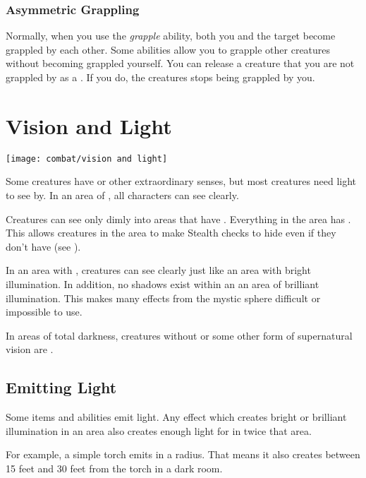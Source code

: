         \subsubsection{Asymmetric Grappling}\label{Asymmetric Grappling}
            Normally, when you use the \textit{grapple} ability, both you and the target become grappled by each other.
            Some abilities allow you to grapple other creatures without becoming grappled yourself.
            You can release a creature that you are not grappled by as a .
            If you do, the creatures stops being grappled by you.

\section{Vision and Light}\label{Vision and Light}
    \texttt{[image: combat/vision and light]}

    Some creatures have  or other extraordinary senses, but most creatures need light to see by. 
    In an area of , all characters can see clearly.

    Creatures can see only dimly into areas that have .
    Everything in the area has .
    This allows creatures in the area to make Stealth checks to hide even if they don't have  (see ).

    In an area with , creatures can see clearly just like an area with bright illumination.
    In addition, no shadows exist within an an area of brilliant illumination.
    This makes many effects from the  mystic sphere difficult or impossible to use.

    In areas of total darkness, creatures without  or some other form of supernatural vision are \blinded.

    \subsection{Emitting Light}
        Some items and abilities emit light.
        Any effect which creates bright or brilliant illumination in an area also creates enough light for  in twice that area.

        For example, a simple torch emits  in a \smallarea radius.
        That means it also creates  between 15 feet and 30 feet from the torch in a dark room.

